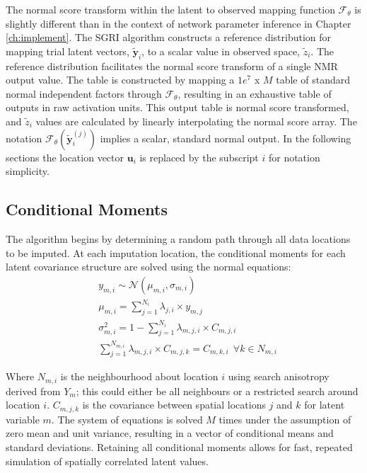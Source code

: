 The normal score transform within the latent to observed mapping function $\mathcal{F}_{\theta}$ is slightly different than in the context of network parameter inference in Chapter \ref{ch:implement}. The \gls{SGRI} algorithm constructs a reference distribution for mapping trial latent vectors, $\tilde{\mathbf{y}}_{i}$,  to a scalar value in observed space, $\tilde{z}_{i}$. The reference distribution facilitates the normal score transform of a single NMR output value. The table is constructed by mapping a $1e^{7}$ x $M$ table of standard normal independent factors through  $\mathcal{F}_{\theta}$, resulting in an exhaustive table of outputs in raw activation units. This output table is normal score transformed, and $\tilde{z}_{i}$ values are calculated by linearly interpolating the normal score array. The notation $\mathcal{F}_{\theta}(\tilde{\mathbf{y}}_{i}^{(j)})$ implies a scalar, standard normal output. In the following sections the location vector $\mathbf{u}_{i}$ is replaced by the subscript $i$ for notation simplicity.

\subsection{Conditional Moments}
\label{subsec:condmom}

The algorithm begins by determining a random path through all data locations to be imputed. At each imputation location, the conditional moments for each latent covariance structure are solved using the normal equations:
\begin{align}
     & y_{m,i} \sim {\mathcal {N}}\left( \mu_{m,i}, \sigma_{m,i} \right)                           \\
     & \mu_{m,i} = \sum_{j=1}^{N_{i}} \lambda_{j,i} \times y_{m,j}                                 \\
     & \sigma_{m,i}^{2} = 1 - \sum_{j=1}^{N_{i}} \lambda_{m,j,i} \times C_{m,j,i}                  \\
     & \sum_{j=1}^{N_{m,i}} \lambda_{m,j,i} \times C_{m,j,k} = C_{m,k,i} \ \ \forall k \in N_{m,i}
\end{align}

Where $N_{m,i}$ is the neighbourhood about location $i$ using search anisotropy derived from $Y_{m}$; this could either be all neighbours or a restricted search around location $i$. $C_{m,j,k}$ is the covariance between spatial locations $j$ and $k$ for latent variable $m$. The system of equations is solved $M$ times under the assumption of zero mean and unit variance, resulting in a vector of conditional means and standard deviations. Retaining all conditional moments allows for fast, repeated simulation of spatially correlated latent values.

